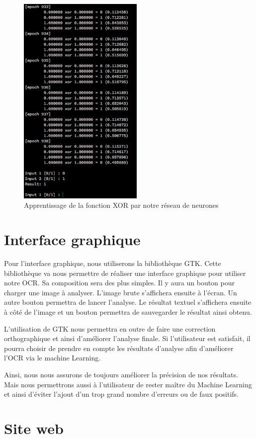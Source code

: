 \documentclass[11pt]{report}
\begin{document}
\begin{figure}[htbp]
\centering
\includegraphics[width=6cm]{xor.png}
\caption{Apprentissage de la fonction XOR par notre réseau de neurones}
\label{xor}
\end{figure}

\chapter{Interface graphique}

Pour l'interface graphique, nous utiliserons la bibliothèque GTK. Cette bibliothèque va nous permettre de réaliser une interface graphique pour utiliser notre OCR. Sa composition sera des plus simples. Il y aura un bouton pour charger une image à analyser. L'image brute s'affichera ensuite à l'écran. Un autre bouton permettra de lancer l'analyse. Le résultat textuel s'affichera ensuite à côté de l'image et un bouton permettra de sauvegarder le résultat ainsi obtenu.

L'utilisation de GTK nous permettra en outre de faire une correction orthographique et ainsi d'améliorer l'analyse finale. Si l'utilisateur est satisfait, il pourra choisir de prendre en compte les résultats d'analyse afin d'améliorer l'OCR via le machine Learning.

Ainsi, nous nous assurons de toujours améliorer la précision de nos résultats. Mais nous permettrons aussi à l'utilisateur de rester maître du Machine Learning et ainsi d'éviter l'ajout d'un trop grand nombre d'erreurs ou de faux positifs.

\chapter{Site web}
\end{document}
